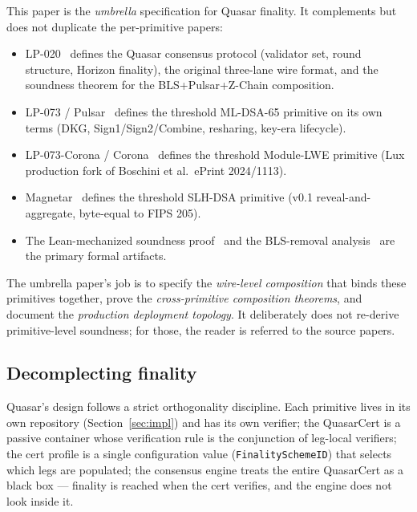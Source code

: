 This paper is the \emph{umbrella} specification for Quasar finality. It
complements but does not duplicate the per-primitive papers:

\begin{itemize}[leftmargin=2em,nosep]
\item LP-020~\cite{lp020} defines the Quasar consensus protocol
      (validator set, round structure, Horizon finality), the original
      three-lane wire format, and the soundness theorem for the
      BLS+Pulsar+Z-Chain composition.
\item LP-073 / Pulsar~\cite{lp073,pulsar} defines the threshold
      ML-DSA-65 primitive on its own terms (DKG, Sign1/Sign2/Combine,
      resharing, key-era lifecycle).
\item LP-073-Corona / Corona~\cite{ringtail,corona}
      defines the threshold Module-LWE primitive (Lux production fork of
      Boschini et al.~ePrint 2024/1113).
\item Magnetar~\cite{magnetar} defines the threshold SLH-DSA
      primitive (v0.1 reveal-and-aggregate, byte-equal to FIPS 205).
\item The Lean-mechanized soundness proof~\cite{quasarcertsoundness}
      and the BLS-removal analysis~\cite{pqfinalitynobls} are the
      primary formal artifacts.
\end{itemize}

The umbrella paper's job is to specify the \emph{wire-level composition}
that binds these primitives together, prove the \emph{cross-primitive
composition theorems}, and document the \emph{production deployment
topology}. It deliberately does not re-derive primitive-level
soundness; for those, the reader is referred to the source papers.

\subsection{Decomplecting finality}

Quasar's design follows a strict orthogonality discipline. Each primitive
lives in its own repository (Section~\ref{sec:impl}) and has its own
verifier; the QuasarCert is a passive container whose verification rule
is the conjunction of leg-local verifiers; the cert profile is a
single configuration value (\texttt{FinalitySchemeID}) that selects
which legs are populated; the consensus engine treats the entire
QuasarCert as a black box --- finality is reached when the cert
verifies, and the engine does not look inside it.

